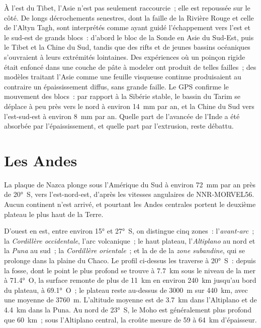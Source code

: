 À l'est du Tibet, l'Asie n'est pas seulement raccourcie~; elle est repoussée sur le côté. De longs décrochements
senestres, dont la faille de la Rivière Rouge et celle de l'Altyn Tagh, sont interprétés comme ayant
guidé l'échappement vers l'est et le sud-est de grands blocs~: d'abord le bloc de la Sonde en Asie du
Sud-Est, puis le Tibet et la Chine du Sud, tandis que des rifts et de jeunes bassins océaniques s'ouvraient
à leurs extrémités lointaines. Des expériences où un poinçon rigide était enfoncé dans une couche de pâte
à modeler ont produit de telles failles~; des modèles traitant l'Asie comme une feuille visqueuse continue
produisaient au contraire un épaississement diffus, sans grande faille. Le GPS confirme le mouvement
des blocs~: par rapport à la Sibérie stable, le bassin du Tarim se déplace à peu près vers le nord à environ
\qty{14}{mm} par an, et la Chine du Sud vers l'est-sud-est à environ \qty{8}{mm} par an. Quelle part de
l'avancée de l'Inde a été absorbée par l'épaississement, et quelle part par l'extrusion, reste débattu.

\section{Les Andes}\label{sec:b2:himalaya-andes:andes}

La plaque de Nazca plonge sous l'Amérique du Sud à environ \qty{72}{mm} par an près de \ang{20}~S,
vers l'est-nord-est, d'après les vitesses angulaires de NNR-MORVEL56. Aucun continent n'est
arrivé, et pourtant les Andes centrales portent le deuxième plateau le plus haut de la Terre.

D'ouest en est, entre environ \ang{15} et \ang{27}~S, on distingue cinq zones~: l'\emph{avant-arc}~;
la \emph{Cordillère occidentale}, l'arc volcanique~; le haut plateau, l'\emph{Altiplano}
au nord et la \emph{Puna} au sud~; la \emph{Cordillère orientale}~; et la  de  de la \emph{zone subandine}, qui se prolonge
dans la plaine du Chaco. Le profil ci-dessus les traverse à \ang{20}~S~: depuis la fosse, dont
le point le plus profond se trouve à \qty{7.7}{km} sous le niveau de la mer à \ang{71.4}~O,
la surface remonte de plus de \qty{11}{km} en environ \qty{240}{km} jusqu'au bord du
plateau, à \ang{69.1}~O~; le plateau reste au-dessus de \qty{3000}{m} sur \qty{440}{km}, avec une
moyenne de \qty{3760}{m}. L'altitude moyenne est de \qty{3.7}{km} dans l'Altiplano et de
\qty{4.4}{km} dans la Puna. Au nord de \ang{23}~S, le Moho est généralement plus profond que
\qty{60}{km}~; sous l'Altiplano central, la croûte mesure de 59 à \qty{64}{km} d'épaisseur.

